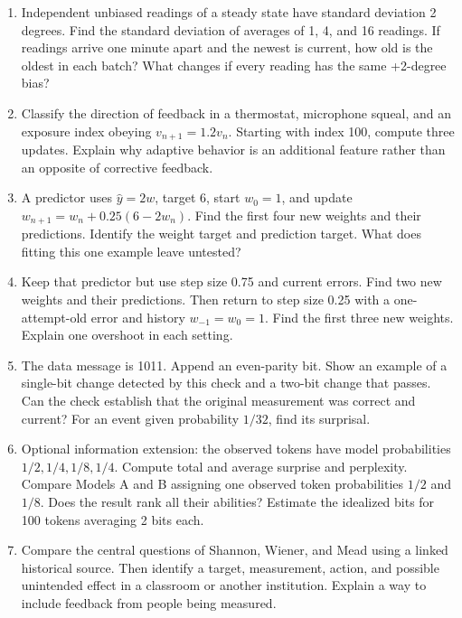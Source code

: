 \documentclass[11pt,letterpaper]{article}
\begin{document}
\begin{enumerate}
\item Independent unbiased readings of a steady state have standard deviation 2 degrees. Find the standard deviation of averages of 1, 4, and 16 readings. If readings arrive one minute apart and the newest is current, how old is the oldest in each batch? What changes if every reading has the same +2-degree bias?
\item Classify the direction of feedback in a thermostat, microphone squeal, and an exposure index obeying $v_{n+1}=1.2v_n$. Starting with index 100, compute three updates. Explain why adaptive behavior is an additional feature rather than an opposite of corrective feedback.
\item A predictor uses $\widehat y=2w$, target 6, start $w_0=1$, and update $w_{n+1}=w_n+0.25(6-2w_n)$. Find the first four new weights and their predictions. Identify the weight target and prediction target. What does fitting this one example leave untested?
\item Keep that predictor but use step size 0.75 and current errors. Find two new weights and their predictions. Then return to step size 0.25 with a one-attempt-old error and history $w_{-1}=w_0=1$. Find the first three new weights. Explain one overshoot in each setting.
\item The data message is 1011. Append an even-parity bit. Show an example of a single-bit change detected by this check and a two-bit change that passes. Can the check establish that the original measurement was correct and current? For an event given probability $1/32$, find its surprisal.
\item Optional information extension: the observed tokens have model probabilities $1/2,1/4,1/8,1/4$. Compute total and average surprise and perplexity. Compare Models A and B assigning one observed token probabilities $1/2$ and $1/8$. Does the result rank all their abilities? Estimate the idealized bits for 100 tokens averaging 2 bits each.
\item Compare the central questions of Shannon, Wiener, and Mead using a linked historical source. Then identify a target, measurement, action, and possible unintended effect in a classroom or another institution. Explain a way to include feedback from people being measured.
\end{enumerate}
\end{document}
